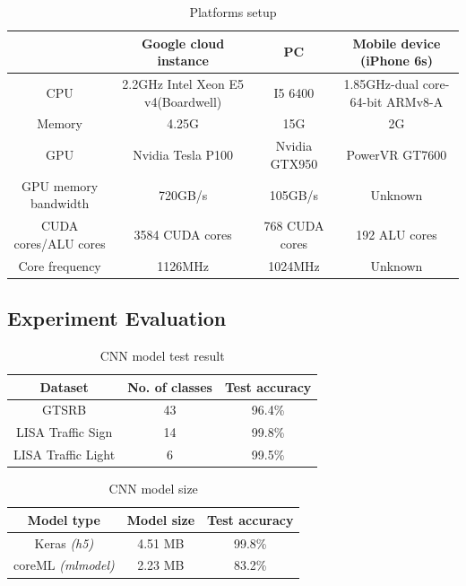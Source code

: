 \documentclass[conference]{IEEEtran}
\begin{document}
\begin{table}
\caption{Platforms setup}
\centering
\begin{tabular}{|c|c|c|c|}
\hline
\textbf{} & \textbf{Google cloud instance}&\textbf{PC}&
\textbf{Mobile device (iPhone 6s)}\\
\hline
CPU & 2.2GHz Intel Xeon E5 v4(Boardwell) & I5 6400 & 1.85GHz-dual core-64-bit ARMv8-A \\
\hline
Memory & 4.25G & 15G & 2G\\
\hline
GPU & Nvidia Tesla P100   & Nvidia GTX950 & PowerVR GT7600 \\
\hline
GPU memory bandwidth & 720GB/s & 105GB/s & Unknown \\ 
\hline
CUDA cores/ALU cores & 3584 CUDA cores & 768 CUDA cores & 192 ALU cores \\
\hline
Core frequency & 1126MHz & 1024MHz & Unknown \\
\hline
\end{tabular}
\end{table}


\subsection{Experiment Evaluation}

\begin{table}[H]
\caption{CNN model test result}
\begin{center}
\begin{tabular}{|c|c|c|}
\hline
\textbf{Dataset} & \textbf{No. of classes}& \textbf{Test accuracy} \\
\hline
GTSRB & 43 & 96.4\% \\
\hline
LISA Traffic Sign & 14 & 99.8\% \\
\hline
LISA Traffic Light& 6 & 99.5\% \\
\hline
\end{tabular}
\label{tab3}
\end{center}
\end{table}

\begin{table}[H]
\caption{CNN model size}
\begin{center}
\begin{tabular}{|c|c|c|}
\hline
\textbf{Model type} & \textbf{Model size} & \textbf{Test accuracy }\\
\hline
Keras \textit{(h5)} & 4.51 MB & 99.8\% \\
\hline
coreML \textit{(mlmodel)} & 2.23 MB & 83.2\% \\
\hline
\end{tabular}
\label{tab3}
\end{center}
\end{table}
\end{document}
